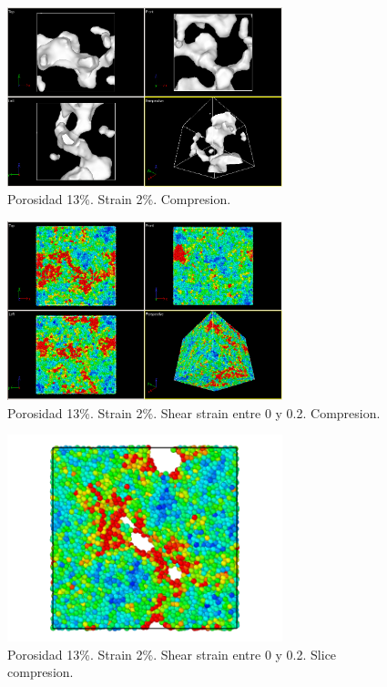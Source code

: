 \documentclass[10pt, oneside]{article} %
\begin{document}
\begin{figure}[H]
\centering
\includegraphics[width=8cm]{Figures/Porosidad/porosidad_13_muestra_2strain.png}
\caption{Porosidad 13\%. Strain 2\%. Compresion.}
\end{figure}

\begin{figure}[H]
\centering
\includegraphics[width=8cm]{Figures/Porosidad/porosidad_13_muestra_2strain_color_0_02.png}
\caption{Porosidad 13\%. Strain 2\%. Shear strain entre 0 y 0.2. Compresion.}
\end{figure}

\begin{figure}[H]
\centering
\includegraphics[width=8cm]{Figures/Porosidad/porosidad_13_muestra_2strain_color_slice_0_02.png}
\caption{Porosidad 13\%. Strain 2\%. Shear strain entre 0 y 0.2. Slice compresion.}
\end{figure}
\end{document}
